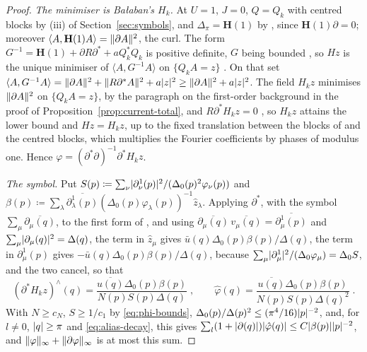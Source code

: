 \documentclass[11pt]{preprint}
\DeclarePairedDelimiter{\abs}{\lvert}{\rvert}
\DeclarePairedDelimiter{\norm}{\lVert}{\rVert}
\numberwithin{equation}{section}
\theoremstyle{definition}
\theoremstyle{remark}
\theoremstyle{plain}
\begin{document}
\begin{proof}
\emph{The minimiser is Ba{\l}aban's $H_k$.} At $U = 1$, $J = 0$, $Q = Q_k$ with centred blocks by (iii) of Section~\ref{sec:symbols}, and $\Delta_\pi = \mathbf H(1)$ by \cite[(3.119), p.~419]{BalabanPBG}, since $\mathbf H(1)\partial = 0$; moreover $\langle A, \mathbf H(1)A \rangle = \norm{\partial A}^2$, the curl. The form $G^{-1} = \mathbf H(1) + \partial R\partial^* + aQ_k^*Q_k$ is positive definite, $G$ being bounded \cite[Theorem~3.3, p.~399]{BalabanPBG}, so $Hz$ is the unique minimiser of $\langle A, G^{-1}A \rangle$ on $\{ Q_kA = z \}$ \cite[(3.122), p.~420]{BalabanPBG}. On that set $\langle A, G^{-1}A \rangle = \norm{\partial A}^2 + \norm{R\partial^*A}^2 + a\abs{z}^2 \geq \norm{\partial A}^2 + a\abs{z}^2$. The field $H_kz$ minimises $\norm{\partial A}^2$ on $\{ Q_kA = z \}$, by the paragraph on the first-order background in the proof of Proposition~\ref{prop:current-total}, and $R\partial^*H_kz = 0$ \cite[p.~29]{BalabanPRT1}, so $H_kz$ attains the lower bound and $Hz = H_kz$, up to the fixed translation between the blocks of \cite{BalabanPRT1} and the centred blocks, which multiplies the Fourier coefficients by phases of modulus one. Hence $\varphi = (\partial^*\partial)^{-1}\partial^*H_kz$.

\emph{The symbol.} Put $S(p) \coloneqq \sum_\nu\abs{\partial^1_\nu(p)}^2/(\Delta_0(p)^2\varphi_\nu(p))$ and $\beta(p) \coloneqq \sum_\lambda\overline{\partial^1_\lambda(p)}(\Delta_0(p)\varphi_\lambda(p))^{-1}\hat z_\lambda$. Applying $\partial^*$, with the symbol $\sum_\mu\overline{\partial_\mu(q)}$, to the first form of \cite[(1.63), p.~28]{BalabanPRT1}, and using $\overline{\partial_\mu(q)}\,\overline{v_\mu(q)} = \overline{\partial^1_\mu(p)}$ and $\sum_\mu\abs{\partial_\mu(q)}^2 = \Delta(q)$, the term in $\hat z_\mu$ gives $\bar u(q)\Delta_0(p)\beta(p)/\Delta(q)$, the term in $\partial^1_\mu(p)$ gives $-\bar u(q)\Delta_0(p)\beta(p)/\Delta(q)$, because $\sum_\mu\abs{\partial^1_\mu}^2/(\Delta_0\varphi_\mu) = \Delta_0S$, and the two cancel, so that
\begin{equation}\label{eq:gauge-parameter-symbol}
    (\partial^*H_kz)^\wedge(q) = \frac{\overline{u(q)}\Delta_0(p)\beta(p)}{N(p)S(p)\Delta(q)}\;,
    \qquad
    \hat\varphi(q) = \frac{\overline{u(q)}\Delta_0(p)\beta(p)}{N(p)S(p)\Delta(q)^2}\;.
\end{equation}
With $N \geq c_N$, $S \geq 1/c_1$ by \eqref{eq:phi-bounds}, $\Delta_0(p)/\Delta(p)^2 \leq (\pi^4/16)\abs{p}^{-2}$, and, for $l \neq 0$, $\abs{q} \geq \pi$ and \eqref{eq:alias-decay}, this gives $\sum_l(1 + \abs{\partial(q)})\abs{\hat\varphi(q)} \leq C\abs{\beta(p)}\abs{p}^{-2}$, and $\norm{\varphi}_\infty + \norm{\partial\varphi}_\infty$ is at most this sum.


\end{proof}
\end{document}

